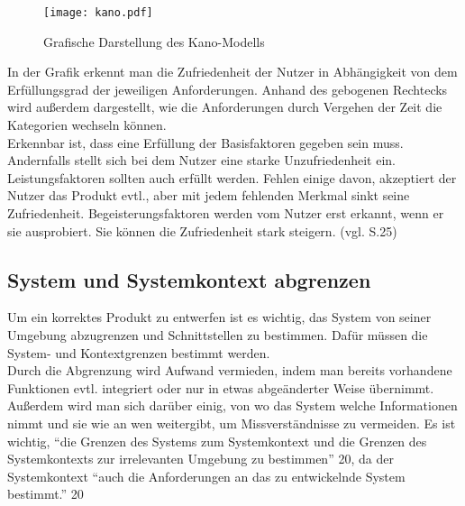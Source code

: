 \documentclass [12pt, a4paper, oneside, titlepage, ngerman]{article}
\begin{document}
\begin{figure}[H]
	\centering
	\texttt{[image: kano.pdf]}
	\caption{Grafische Darstellung des Kano-Modells}
	\label{img:kano}
\end{figure}

\noindent In der Grafik erkennt man die Zufriedenheit der Nutzer in Abhängigkeit von dem Erfüllungsgrad der jeweiligen Anforderungen. Anhand des gebogenen Rechtecks wird außerdem dargestellt, wie die Anforderungen durch Vergehen der Zeit die Kategorien wechseln können. \\
Erkennbar ist, dass eine Erfüllung der Basisfaktoren gegeben sein muss. Andernfalls stellt sich bei dem Nutzer eine starke Unzufriedenheit ein. Leistungsfaktoren sollten auch erfüllt werden. Fehlen einige davon, akzeptiert der Nutzer das Produkt evtl., aber mit jedem fehlenden Merkmal sinkt seine Zufriedenheit. Begeisterungsfaktoren werden vom Nutzer erst erkannt, wenn er sie ausprobiert. Sie können die Zufriedenheit stark steigern. (vgl. S.25)



\subsection{System und Systemkontext abgrenzen}
Um ein korrektes Produkt zu entwerfen ist es wichtig, das System von seiner Umgebung abzugrenzen und Schnittstellen zu bestimmen. Dafür müssen die System- und Kontextgrenzen bestimmt werden. \\
Durch die Abgrenzung wird Aufwand vermieden, indem man bereits vorhandene Funktionen evtl. integriert oder nur in etwas abgeänderter Weise übernimmt. Außerdem wird man sich darüber einig, von wo das System welche Informationen nimmt und sie wie an wen weitergibt, um Missverständnisse zu vermeiden. Es ist wichtig, {\color{blue} "`die Grenzen des Systems zum Systemkontext und die Grenzen des Systemkontexts zur irrelevanten Umgebung zu bestimmen"' 20}, da der Systemkontext {\color{blue} "`auch die Anforderungen an das zu entwickelnde System bestimmt."' 20}
\newpage
\end{document}
